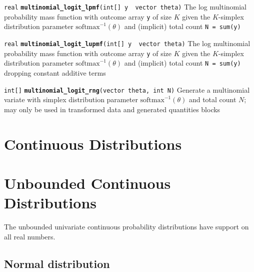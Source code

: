 \documentclass[
  10pt,
]{book}
\begin{document}

\texttt{real} \textbf{\texttt{multinomial\_logit\_lpmf}}\texttt{(int{[}{]}\ y\ \textbar{}\ vector\ theta)}\newline
The log multinomial probability mass function with outcome array \texttt{y}
of size \(K\) given the \(K\)-simplex distribution parameter \(\text{softmax}^{-1}(\theta)\) and
(implicit) total count \texttt{N\ =\ sum(y)}


\texttt{real} \textbf{\texttt{multinomial\_logit\_lupmf}}\texttt{(int{[}{]}\ y\ \textbar{}\ vector\ theta)}\newline
The log multinomial probability mass function with outcome array \texttt{y}
of size \(K\) given the \(K\)-simplex distribution parameter \(\text{softmax}^{-1}(\theta)\) and (implicit) total count \texttt{N\ =\ sum(y)} dropping constant additive
terms


\texttt{int{[}{]}} \textbf{\texttt{multinomial\_logit\_rng}}\texttt{(vector\ theta,\ int\ N)}\newline
Generate a multinomial variate with simplex distribution parameter
\(\text{softmax}^{-1}(\theta)\) and total count \(N\); may only be used in transformed data and
generated quantities blocks

\hypertarget{continuous-distributions}{%
\chapter*{Continuous Distributions}\label{continuous-distributions}}

\hypertarget{unbounded-continuous-distributions}{%
\chapter{Unbounded Continuous Distributions}\label{unbounded-continuous-distributions}}

The unbounded univariate continuous probability distributions have
support on all real numbers.

\hypertarget{normal-distribution}{%
\section{Normal distribution}\label{normal-distribution}}
\end{document}

